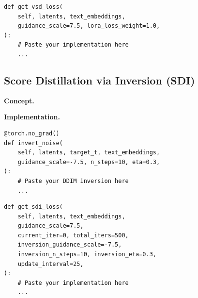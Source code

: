 \begin{lstlisting}
def get_vsd_loss(
    self, latents, text_embeddings,
    guidance_scale=7.5, lora_loss_weight=1.0,
):
    # Paste your implementation here
    ...
\end{lstlisting}

\subsection{Score Distillation via Inversion (SDI)}
\label{sec:sdi}

\noindent\textbf{Concept.}

\noindent\textbf{Implementation.}

\begin{lstlisting}
@torch.no_grad()
def invert_noise(
    self, latents, target_t, text_embeddings,
    guidance_scale=-7.5, n_steps=10, eta=0.3,
):
    # Paste your DDIM inversion here
    ...
\end{lstlisting}

\begin{lstlisting}
def get_sdi_loss(
    self, latents, text_embeddings,
    guidance_scale=7.5,
    current_iter=0, total_iters=500,
    inversion_guidance_scale=-7.5,
    inversion_n_steps=10, inversion_eta=0.3,
    update_interval=25,
):
    # Paste your implementation here
    ...
\end{lstlisting}
